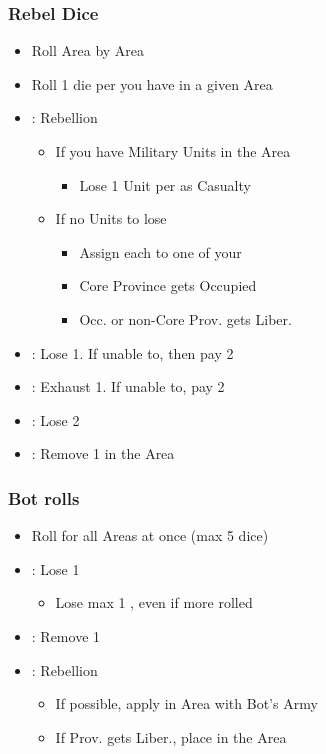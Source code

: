 \documentclass[10pt]{article}
\begin{document}
\subsubsection*{Rebel Dice}
\begin{itemize}
	\item Roll Area by Area
	\item Roll 1 die per \unrest you have in a given Area
	\item \rebellion: Rebellion
	\begin{itemize}
		\item If you have Military Units in the Area
		\begin{itemize}
			\item Lose 1 Unit per \rebellion as Casualty
		\end{itemize}
		\item If no Units to lose
		\begin{itemize}
			\item Assign each \rebellion to one of your \unrest
			\item Core Province gets Occupied
			\item Occ. or non-Core Prov. gets Liber.
		\end{itemize}
	\end{itemize}
	\item \losemonarchpower: Lose 1\monarchpower. If unable to, then pay 2\ducats
	\item \exhaustunits: Exhaust 1\manpower. If unable to, pay 2\ducats
	\item \loseducats: Lose 2\ducats
	\item \removeunrest: Remove 1 \unrest in the Area
\end{itemize}

\subsubsection*{\botrules Bot rolls }
{\botrules
\begin{itemize}
	\item Roll for all Areas at once (max 5 dice)
	\item \loseducats \exhaustunits \losemonarchpower: Lose 1 \botpower
	\begin{itemize}
		\item Lose max 1 \botpower, even if more rolled
	\end{itemize}
	\item \removeunrest: Remove 1 \unrest
	\item \rebellion: Rebellion
	\begin{itemize}
		\item If possible, apply in Area with Bot's Army
		\item If Prov. gets Liber., place \claim in the Area
	\end{itemize}
\end{itemize}
}
\end{document}
